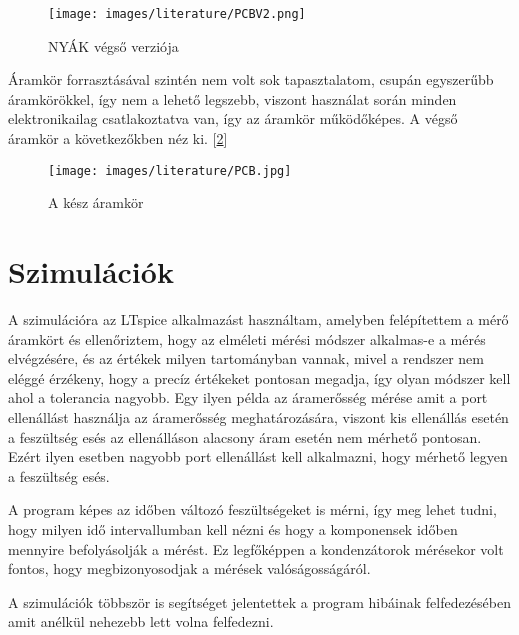 \begin{figure}[h]
    \centering
    \texttt{[image: images/literature/PCBV2.png]}
    \caption{NYÁK végső verziója}
    \label{fig:PCBV2}
\end{figure}


Áramkör forrasztásával szintén nem volt sok tapasztalatom, csupán egyszerűbb
áramkörökkel, így nem a lehető legszebb, viszont használat során minden elektronikailag
csatlakoztatva van, így az áramkör működőképes. A végső áramkör a következőkben néz ki.
[\ref{fig:Aramkor}]


\begin{figure}[H]
    \centering
    \texttt{[image: images/literature/PCB.jpg]}
    \caption{A kész áramkör}
    \label{fig:Aramkor}
\end{figure}

\section{Szimulációk}

A szimulációra az LTspice \cite{LTspice} alkalmazást használtam, 
amelyben felépítettem a mérő áramkört és ellenőriztem, hogy az elméleti
mérési módszer alkalmas-e a mérés elvégzésére, és az értékek milyen
tartományban vannak, mivel a rendszer nem eléggé érzékeny, hogy a precíz
értékeket pontosan megadja, így olyan módszer kell ahol a tolerancia nagyobb.
Egy ilyen példa az áramerősség mérése amit a port ellenállást használja az
áramerősség meghatározására, viszont kis ellenállás esetén a
feszültség esés az ellenálláson alacsony áram esetén nem mérhető pontosan.
Ezért ilyen esetben nagyobb port ellenállást kell alkalmazni, hogy mérhető 
legyen a feszültség esés.

A program képes az időben változó feszültségeket is mérni, így
meg lehet tudni, hogy milyen idő intervallumban kell nézni és hogy
a komponensek időben mennyire befolyásolják a mérést. Ez 
legfőképpen a kondenzátorok mérésekor volt fontos, hogy megbizonyosodjak
a mérések valóságosságáról.

A szimulációk többször is segítséget jelentettek a program 
hibáinak felfedezésében amit anélkül nehezebb lett volna felfedezni.

